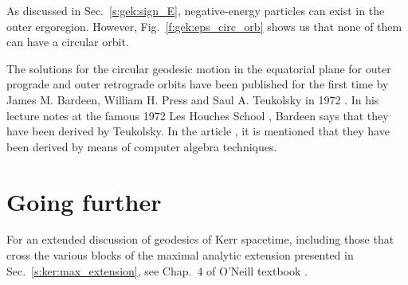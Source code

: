 \begin{remark}
As discussed in Sec.~\ref{s:gek:sign_E}, negative-energy particles can exist in
the outer ergoregion. However, Fig.~\ref{f:gek:eps_circ_orb} shows us that none
of them can have a circular orbit.
\end{remark}



\begin{hist}
The solutions for the circular geodesic motion in the equatorial plane
for outer prograde and outer retrograde orbits have been published for the first
time by James M. Bardeen, William H. Press and Saul A. Teukolsky in 1972 \cite{BardePT72}. In his lecture notes at the famous
1972 Les Houches School \cite{Barde73}, Bardeen says that they have been derived by Teukolsky.
In the article \cite{BardePT72}, it is mentioned that they have been derived by means of
computer algebra techniques.
\end{hist}









\section{Going further}

For an extended discussion of geodesics of Kerr spacetime, including those
that cross the various blocks of the maximal analytic extension presented in
Sec.~\ref{s:ker:max_extension}, see Chap.~4 of O'Neill textbook \cite{ONeil95}.

